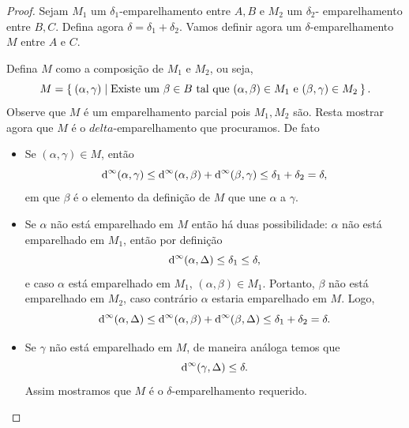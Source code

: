\begin{proof}
    Sejam $M_1$ um $\delta_1$-emparelhamento entre $A,B$ e $M_2$ um $\delta_2$-
    emparelhamento entre $B,C$. Defina agora $\delta = \delta_1 + \delta_2$. 
    Vamos definir agora um $\delta$-emparelhamento $M$ entre $A$ e $C$.
    
    Defina $M$ como a composição de $M_1$ e $M_2$, ou seja,
    \begin{equation*}
        M = \Set{(\alpha, \gamma) | \text{Existe um } \beta \in B \text{ tal que }
        (\alpha, \beta) \in M_1 \text{ e } (\beta, \gamma) \in M_2}.
    \end{equation*}
    Observe que $M$ é um emparelhamento parcial pois $M_1, M_2$ são. Resta 
    mostrar agora que $M$ é o $delta$-emparelhamento que procuramos. De fato
    \begin{itemize}
        \item Se $(\alpha, \gamma) \in M$, então
        \begin{equation*}
            \text{d}^\infty(\alpha, \gamma) \leq \text{d}^\infty(\alpha, \beta) + \text{d}^\infty(\beta, \gamma) 
            \leq \delta_1 + \delta_2 = \delta,
        \end{equation*}
        em que $\beta$ é o elemento da definição de $M$ que une $\alpha$ a $\gamma$. 
        \item Se $\alpha$ não está emparelhado em $M$ então há duas possibilidade:
        $\alpha$ não está emparelhado em $M_1$, então por definição
        \begin{equation*}
            \text{d}^\infty(\alpha, \Delta) \leq \delta_1 \leq \delta,
        \end{equation*}
        e caso $\alpha$ está emparelhado em $M_1$, $(\alpha, \beta) \in M_1$. 
        Portanto, $\beta$ não está emparelhado em $M_2$, caso contrário $\alpha$ estaria 
        emparelhado em $M$. Logo, 
        \begin{equation*}
            \text{d}^\infty(\alpha, \Delta) \leq \text{d}^\infty(\alpha, \beta) + \text{d}^\infty(\beta, \Delta) 
            \leq \delta_1 + \delta_2 = \delta.
        \end{equation*}
        \item Se $\gamma$ não está emparelhado em $M$, de maneira análoga temos que 
        \begin{equation*}
            \text{d}^\infty(\gamma, \Delta) \leq \delta.
        \end{equation*}
        Assim mostramos que $M$ é o $\delta$-emparelhamento requerido. 
    \end{itemize}
\end{proof}

